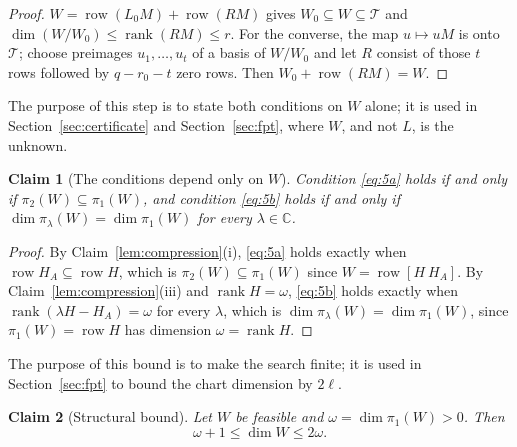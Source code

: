 \documentclass[journal]{IEEEtran}
\theoremstyle{plainn}
\newtheorem{claim}{Claim}
\theoremstyle{remark}
\begin{document}
\begin{proof}
$W=\operatorname{row}(L_0M)+\operatorname{row}(RM)$ gives $W_0 \subseteq W\subseteq\mathcal T$ and $\dim(W/W_0)\le\operatorname{rank}(RM)\le r$. 
For the converse, the map $u\mapsto uM$ is onto $\mathcal T$; choose preimages $u_1,\dots,u_t$ of a basis of
$W/W_0$ and let $R$ consist of those $t$ rows followed by $q-r_0-t$ zero rows. Then
$W_0+\operatorname{row}(RM)=W$.
\end{proof}

The purpose of this step is to state both conditions on $W$ alone; it is used in Section~\ref{sec:certificate} and Section~\ref{sec:fpt}, where $W$, and not $L$, is the unknown.

\begin{claim}[The conditions depend only on $W$]\label{lem:W-conditions}
Condition \eqref{eq:5a} holds if and only if $\pi_2(W)\subseteq\pi_1(W)$, and condition
\eqref{eq:5b} holds if and only if $\dim\pi_\lambda(W)=\dim\pi_1(W)$ for every
$\lambda\in\mathbb C$.
\end{claim}

\begin{proof}
By Claim~\ref{lem:compression}(i), \eqref{eq:5a} holds exactly when
$\operatorname{row}H_A\subseteq\operatorname{row}H$, which is $\pi_2(W)\subseteq\pi_1(W)$ since
$W=\operatorname{row}[H\ H_A]$. By Claim~\ref{lem:compression}(iii) and $\operatorname{rank}H=\omega$,
\eqref{eq:5b} holds exactly when $\operatorname{rank}(\lambda H-H_A)=\omega$ for every $\lambda$, which
is $\dim\pi_\lambda(W)=\dim\pi_1(W)$, since $\pi_1(W)=\operatorname{row}H$ has dimension
$\omega=\operatorname{rank}H$.
\end{proof}

The purpose of this bound is to make the search finite; it is used in Section~\ref{sec:fpt} to bound the chart dimension by $2\ell$.

\begin{claim}[Structural bound]\label{lem:struct}
Let $W$ be feasible and $\omega=\dim\pi_1(W)>0$. Then
\begin{equation}\label{eq:struct}
\omega+1\le\dim W\le2\omega .
\end{equation}
\end{claim}
\end{document}
